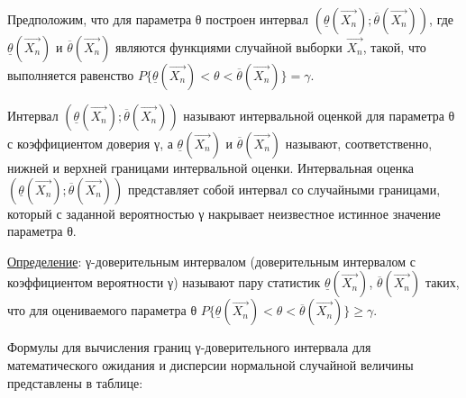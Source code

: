 \documentclass[12pt,a4paper]{scrartcl}
\begin{document}
Предположим, что для параметра θ построен интервал $(\underline {θ}(\overrightarrow {X_n}); \overline {θ}(\overrightarrow {X_n}))$, где $\underline {θ}(\overrightarrow {X_n})$ и $\overline {θ}(\overrightarrow {X_n})$ являются функциями случайной выборки $\overrightarrow {X_n}$, такой, что выполняется равенство $P\{\underline {θ}(\overrightarrow {X_n}) < θ < \overline {θ}(\overrightarrow {X_n}) \} = γ$.

Интервал $(\underline {θ}(\overrightarrow {X_n}); \overline {θ}(\overrightarrow {X_n}))$ называют интервальной оценкой для параметра θ с коэффициентом доверия γ, а $\underline {θ}(\overrightarrow {X_n})$ и $\overline {θ}(\overrightarrow {X_n})$ называют, соответственно, нижней и верхней границами интервальной оценки. Интервальная оценка $(\underline {θ}(\overrightarrow {X_n}); \overline {θ}(\overrightarrow {X_n}))$ представляет собой интервал со случайными границами, который с заданной вероятностью γ накрывает неизвестное истинное значение параметра θ.

\underline {Определение}: γ-доверительным интервалом (доверительным интервалом с коэффициентом вероятности γ) называют пару статистик  $\underline {θ}(\overrightarrow {X_n})$, $\overline {θ}(\overrightarrow {X_n})$ таких, что для оцениваемого параметра θ $P\{\underline {θ}(\overrightarrow {X_n}) < θ < \overline {θ}(\overrightarrow {X_n}) \} \ge γ$.

Формулы для вычисления границ γ-доверительного интервала для математического ожидания и дисперсии нормальной случайной величины представлены в таблице:
\end{document}
